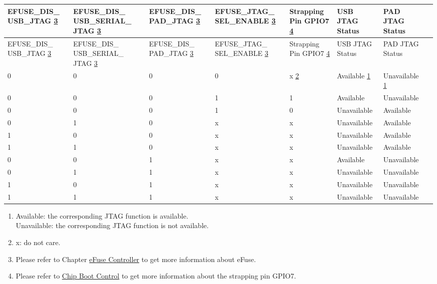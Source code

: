 
\begin{longtable}{ | p{1.8cm} | p{1.9cm} | p{2.1cm} | p{1.9cm} | p{2.1cm} | p{1.4cm} | p{1.7cm} | p{2.0cm} | }
\hline\rowcolor{lightgray}
EFUSE\_DIS\_ USB\_JTAG \hyperref[JTAG footnote: 3]{3} & EFUSE\_DIS\_ USB\_SERIAL\_ JTAG \hyperref[JTAG footnote: 3]{3} & EFUSE\_DIS\_ PAD\_JTAG \hyperref[JTAG footnote: 3]{3} & EFUSE\_JTAG\_ SEL\_ENABLE \hyperref[JTAG footnote: 3]{3} & Strapping Pin GPIO7 \hyperref[JTAG footnote: 4]{4} & USB JTAG Status & PAD JTAG Status \\ \hline
\endfirsthead
\hline
\rowcolor{lightgray}
EFUSE\_DIS\_ USB\_JTAG \hyperref[JTAG footnote: 3]{3} & EFUSE\_DIS\_ USB\_SERIAL\_ JTAG \hyperref[JTAG footnote: 3]{3} & EFUSE\_DIS\_ PAD\_JTAG \hyperref[JTAG footnote: 3]{3} & EFUSE\_JTAG\_ SEL\_ENABLE \hyperref[JTAG footnote: 3]{3} & Strapping Pin GPIO7 \hyperref[JTAG footnote: 4]{4} & USB JTAG Status & PAD JTAG Status \\ \hline
\hline
\endhead
\endfoot

0 & 0 & 0 & 0 & x \hyperref[JTAG footnote: 2]{2}	& Available	 \hyperref[JTAG footnote: 1]{1}  &     Unavailable  \hyperref[JTAG footnote: 1]{1}  \\\hline
0 & 0 & 0 & 1 & 1	& Available	  &     Unavailable   \\\hline
0 & 0 & 0 & 1 & 0	& Unavailable & 	Available \\\hline
0 & 1 & 0 & x & x	& Unavailable & 	Available \\\hline
1 & 0 & 0 & x & x	& Unavailable & 	Available \\\hline
1 & 1 & 0 & x & x	& Unavailable & 	Available \\\hline
0 & 0 & 1 & x & x	& Available	  &     Unavailable \\\hline
0 & 1 & 1 & x & x	& Unavailable & 	Unavailable \\\hline
1 & 0 & 1 & x & x	& Unavailable & 	Unavailable \\\hline
1 & 1 & 1 & x & x	& Unavailable & 	Unavailable \\\hline

\end{longtable}

\begin{tiplisting}
\vspace{-2em}
\begin{enumerate}
\item \label{JTAG footnote: 1}
    Available: the corresponding JTAG function is available. \\
    Unavailable: the corresponding JTAG function is not available.
\item \label{JTAG footnote: 2}
    x: do not care.
\item \label{JTAG footnote: 3}
    Please refer to Chapter \hyperref[mod:efuse]{eFuse Controller} to get more information about eFuse.
\item \label{JTAG footnote: 4}
    Please refer to \hyperref[mod:bootctrl]{Chip Boot Control} to get more information about the strapping pin GPIO7.
\end{enumerate}
\end{tiplisting}
